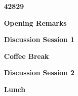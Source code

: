 
\item[] {\Large\bfseries 42829}\\\vspace{1.5ex}

\vspace{1ex}
\item[] {\bfseries Opening Remarks}
\item[$\bullet$] 
\item[$\bullet$] 
\item[$\bullet$] 

\vspace{1ex}
\item[] {\bfseries Discussion Session 1}

\vspace{1ex}
\item[] {\bfseries Coffee Break}
\item[$\bullet$] 
\item[$\bullet$] 

\vspace{1ex}
\item[] {\bfseries Discussion Session 2}

\vspace{1ex}
\item[] {\bfseries Lunch}
